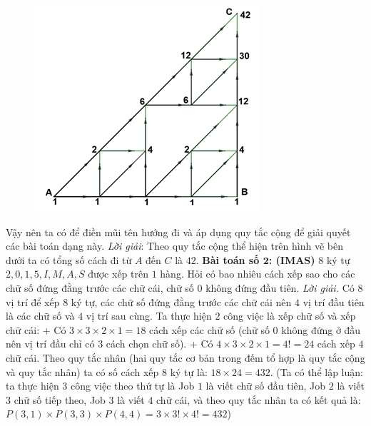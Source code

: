 \begin{multicols}{2}
	\vskip 0.1cm
		\begin{figure}[H]
			\centering
			\vspace*{-5pt}
			\captionsetup{labelformat=empty, justification=centering}
			\includegraphics[width=0.75\linewidth]{_7}
			\vspace*{-15pt}
		\end{figure}
		Vậy nên ta có để điền mũi tên hướng đi và áp dụng quy tắc cộng để giải quyết các bài toán dạng này.
		\vskip 0.1cm
		\textit{Lời giải}: Theo quy tắc cộng thể hiện trên hình vẽ bên dưới ta có tổng số cách đi từ $A$ đến $C$ là $42$.
	\vskip 0.1cm
	\textbf{\color{toancuabi}Bài toán số $\pmb{2}$: (IMAS)}
	\vskip 0.1cm
	$8$ ký tự $2,0,1,5,I,M,A,S$ được xếp trên $1$ hàng. Hỏi có bao nhiêu cách xếp sao cho các chữ số đứng đằng trước các chữ cái, chữ số $0$ không đứng đầu tiên.
	\vskip 0.1cm
	\textit{Lời giải.}
	Có $8$ vị trí để xếp $8$ ký tự, các chữ số đứng đằng trước các chữ cái nên $4$ vị trí đầu tiên là các chữ số và $4$ vị trí sau cùng. Ta thực hiện $2$ công việc là xếp chữ số và xếp chữ cái:
	\vskip 0.1cm
	+ Có $3\times3\times2\times1=18$ cách xếp các chữ số (chữ số $0$ không đứng ở đầu nên vị trí đầu chỉ có $3$ cách chọn chữ số).
	\vskip 0.1cm
	+ Có $4\times3\times2\times1=4!=24$ cách xếp $4$ chữ cái.
	\vskip 0.1cm
	Theo quy tắc nhân (hai quy tắc cơ bản trong đếm tổ hợp là quy tắc cộng và quy tắc nhân) ta có số cách xếp $8$ ký tự là: $18\times24=432$.
	\vskip 0.1cm
	(Ta có thể lập luận: ta thực hiện $3$ công việc theo thứ tự là Job $1$ là viết chữ số đầu tiên, Job $2$ là viết $3$ chữ số tiếp theo, Job $3$ là viết $4$ chữ cái, và theo quy tắc nhân ta có kết quả là: $P(3,1)\times P(3,3)\times P(4,4)=3\times3!\times4!=432$)

\end{multicols}
